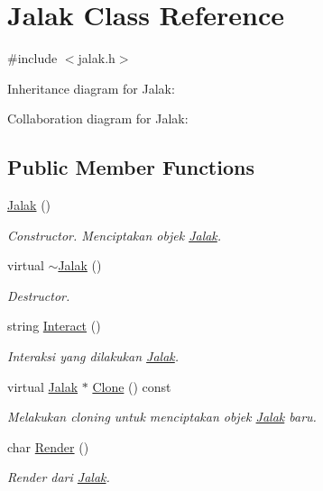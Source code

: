 \hypertarget{classJalak}{}\section{Jalak Class Reference}
\label{classJalak}


{\ttfamily \#include $<$jalak.\+h$>$}



Inheritance diagram for Jalak\+:


Collaboration diagram for Jalak\+:
\subsection*{Public Member Functions}
\begin{DoxyCompactItemize}
\item 
\hyperlink{classJalak_a3887e1118830188e1aeffee215b2816f}{Jalak} ()
\begin{DoxyCompactList}\small\item\em Constructor. Menciptakan objek \hyperlink{classJalak}{Jalak}. \end{DoxyCompactList}\item 
virtual \hyperlink{classJalak_a2c1e4e68ab9126c034520c2c845a5afa}{$\sim$\+Jalak} ()
\begin{DoxyCompactList}\small\item\em Destructor. \end{DoxyCompactList}\item 
string \hyperlink{classJalak_a864b931f04f1580759c4a108e1734bb8}{Interact} ()
\begin{DoxyCompactList}\small\item\em Interaksi yang dilakukan \hyperlink{classJalak}{Jalak}. \end{DoxyCompactList}\item 
virtual \hyperlink{classJalak}{Jalak} $\ast$ \hyperlink{classJalak_a85b145221386cdca75274b4438250161}{Clone} () const 
\begin{DoxyCompactList}\small\item\em Melakukan cloning untuk menciptakan objek \hyperlink{classJalak}{Jalak} baru. \end{DoxyCompactList}\item 
char \hyperlink{classJalak_af500189104401b66d6ab4e3b1106ce74}{Render} ()
\begin{DoxyCompactList}\small\item\em Render dari \hyperlink{classJalak}{Jalak}. \end{DoxyCompactList}\end{DoxyCompactItemize}
